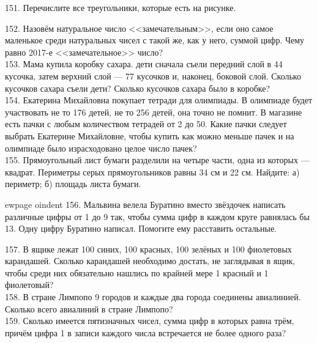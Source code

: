 151. Перечислите все треугольники, которые есть на рисунке.
\begin{center}
\begin{figure}[ht!]
\end{figure}
\end{center}
152. Назовём натуральное число <<замечательным>>, если оно самое маленькое среди натуральных чисел с такой же, как у него, суммой цифр. Чему равно 2017-е <<замечательное>> число?\\
153. Мама купила коробку сахара. дети сначала съели передний слой в 44 кусочка, затем верхний слой --- 77 кусочков и, наконец, боковой слой. Сколько кусочков сахара съели дети? Сколько кусочков сахара было в коробке?\\
154. Екатерина Михайловна покупает тетради для олимпиады. В олимпиаде будет участвовать не то 176 детей, не то 256 детей, она точно не помнит. В магазине есть пачки с любым количеством тетрадей от 2 до 50. Какие пачки следует выбрать Екатерине Михайловне, чтобы купить как можно меньше пачек и на олимпиаде было израсходовано целое число пачек?\\
155. Прямоугольный лист бумаги разделили на четыре части, одна из которых --- квадрат. Периметры серых прямоугольников равны 34 см и 22 см. Найдите: а) периметр; б) площадь листа бумаги.
\begin{center}
\begin{figure}[ht!]
\end{figure}
\end{center}
ewpage
oindent
156. Мальвина велела Буратино вместо звёздочек написать различные цифры от 1 до 9 так, чтобы сумма цифр в каждом круге равнялась бы 13. Одну цифру Буратино написал. Помогите ему расставить остальные.
\begin{center}
\begin{figure}[ht!]
\end{figure}
\end{center}
157. В ящике лежат 100 синих, 100 красных, 100 зелёных и 100 фиолетовых карандашей. Сколько карандашей необходимо достать, не заглядывая в ящик, чтобы среди них обязательно нашлись по крайней мере 1 красный и 1 фиолетовый?\\
158. В стране Лимпопо 9 городов и каждые два города соединены авиалинией. Сколько всего авиалиний в стране Лимпопо?\\
159. Сколько имеется пятизначных чисел, сумма цифр в которых равна трём, причём цифра 1 в записи каждого числа встречается не более одного раза?\\
